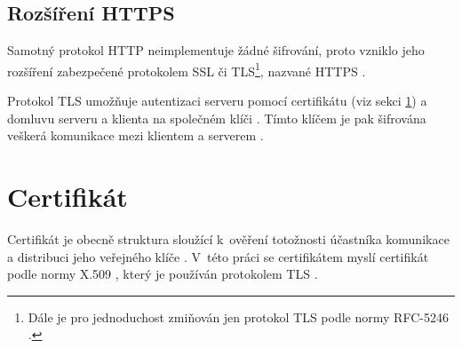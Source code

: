 \subsection{Rozšíření HTTPS}

Samotný protokol HTTP neimplementuje žádné šifrování, proto vzniklo jeho rozšíření zabezpečené protokolem SSL či TLS\footnote{Dále je pro jednoduchost zmiňován jen protokol TLS podle normy RFC-5246 \cite{rfc5246}.}, nazvané HTTPS \cite{tcp_sec}.

Protokol TLS umožňuje autentizaci serveru pomocí certifikátu (viz sekci \ref{sec:th_cert}) a domluvu serveru a klienta na společném klíči \cite{tcp_sec}. Tímto klíčem je pak šifrována veškerá komunikace mezi klientem a serverem \cite{tcp_sec}.







\section{Certifikát}
\label{sec:th_cert}

Certifikát je obecně struktura sloužící k~ověření totožnosti účastníka komunikace a distribuci jeho veřejného klíče \cite{tcp_sec}. V~této práci se certifikátem myslí certifikát podle normy X.509 \cite{rfc2459}, který je používán protokolem TLS \cite{rfc5246}.

